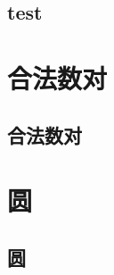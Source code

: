 \subsection{test}
\raggedbottom
\hrulefill

\section{合法数对}
\subsection{合法数对}
\raggedbottom
\hrulefill

\section{圆}
\subsection{圆}
\raggedbottom
\hrulefill

